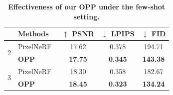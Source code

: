 \begin{table}[t!]
     \caption{\textbf{Effectiveness of our OPP under the few-shot setting.}}
     \label{tab:fewshot_extension}
     \vspace{-4mm}
\setlength\tabcolsep{9pt}
   \begin{tabular}{c|lccc}
        \rowcolor[gray]{.9}
        \hline
        \multicolumn{1}{l|}{Shot}   & Methods & $\uparrow$ PSNR            & $\downarrow$ LPIPS          & $\downarrow$ FID             \\ \hline \hline
        \multirow{2}{*}{2} & PixelNeRF~\cite{PixelNeRF_yu2021pixelnerf}     & 17.62          & 0.378          & 194.71          \\
                                & \textbf{OPP}   & \textbf{17.75} & \textbf{0.345} & \textbf{143.38} \\ \hline
        \multirow{2}{*}{3} & PixelNeRF~\cite{PixelNeRF_yu2021pixelnerf}     & 18.30          & 0.358          & 182.67          \\
                                & \textbf{OPP}   & \textbf{18.45} & \textbf{0.323} & \textbf{134.24} \\ \hline
        \end{tabular}
\end{table}